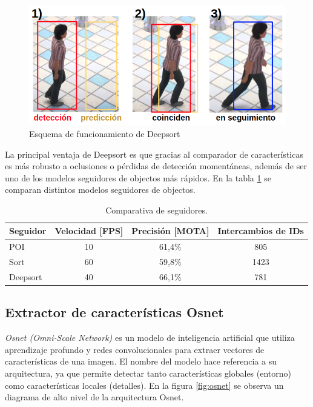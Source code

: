 \begin{figure}[ht]
	\centering
	\includegraphics[scale=.65]{./Figures/deepsortProcess.png}
	\caption{Esquema de funcionamiento de Deepsort}
	\label{fig:deepsortProcess}
\end{figure}

La principal ventaja de Deepsort es que gracias al comparador de características es más robusto a oclusiones o pérdidas de detección momentáneas, además de ser uno de los modelos seguidores de objectos más rápidos. En la tabla \ref{tab:comparativaSeguidores} se comparan distintos modelos seguidores de objectos.

\begin{table}[h]
	\centering
	\caption[Comparativa de seguidores]{Comparativa de seguidores.}
	\begin{tabular}{l c c c}    
		\toprule
		\textbf{Seguidor} & \textbf{Velocidad [FPS]}  & \textbf{Precisión [MOTA]} & \textbf{Intercambios de IDs} \\
		\midrule
		POI & 10 & 61,4\% & 805 \\
		Sort & 60 & 59,8\% & 1423 \\
		Deepsort & 40 & 66,1\% & 781 \\
		\bottomrule
		\hline
	\end{tabular}
	\label{tab:comparativaSeguidores}
\end{table}

\newpage

\subsection{Extractor de características Osnet}
\label{sec:exactorOsnet}

\textit{Osnet (Omni-Scale Network)} \citep{OSNET} es un modelo de inteligencia artificial que utiliza aprendizaje profundo y redes convolucionales para extraer vectores de características de una imagen. El nombre del modelo hace referencia a su arquitectura, ya que permite detectar tanto características globales (entorno) como características locales (detalles). En la figura \ref{fig:osnet} se observa un diagrama de alto nivel de la arquitectura Osnet.

